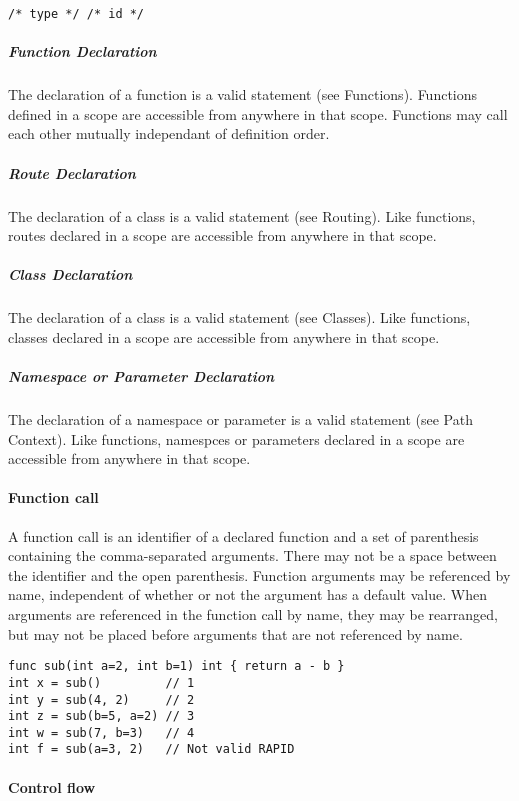 \documentclass[]{article}
\begin{document}
\begin{verbatim}
/* type */ /* id */
\end{verbatim}

\subparagraph{Function Declaration}\label{function-declaration}

The declaration of a function is a valid statement (see Functions).
Functions defined in a scope are accessible from anywhere in that scope.
Functions may call each other mutually independant of definition order.

\subparagraph{Route Declaration}\label{route-declaration}

The declaration of a class is a valid statement (see Routing). Like
functions, routes declared in a scope are accessible from anywhere in
that scope.

\subparagraph{Class Declaration}\label{class-declaration}

The declaration of a class is a valid statement (see Classes). Like
functions, classes declared in a scope are accessible from anywhere in
that scope.

\subparagraph{Namespace or Parameter
Declaration}\label{namespace-or-parameter-declaration}

The declaration of a namespace or parameter is a valid statement (see
Path Context). Like functions, namespces or parameters declared in a
scope are accessible from anywhere in that scope.

\paragraph{Function call}\label{function-call}

A function call is an identifier of a declared function and a set of
parenthesis containing the comma-separated arguments. There may not be a
space between the identifier and the open parenthesis. Function
arguments may be referenced by name, independent of whether or not the
argument has a default value. When arguments are referenced in the
function call by name, they may be rearranged, but may not be placed
before arguments that are not referenced by name.

\begin{verbatim}
func sub(int a=2, int b=1) int { return a - b }
int x = sub()         // 1
int y = sub(4, 2)     // 2
int z = sub(b=5, a=2) // 3
int w = sub(7, b=3)   // 4
int f = sub(a=3, 2)   // Not valid RAPID
\end{verbatim}

\paragraph{Control flow}\label{control-flow}
\end{document}
